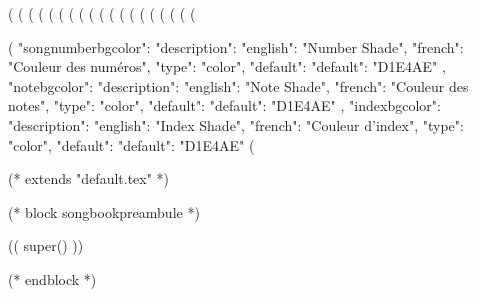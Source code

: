 (%
(%
(%
(%
(%
(%
(%
(%
(%
(%
(%
(%
(%
(%
(%
(%
(%
(%
(%


(%
{
"songnumberbgcolor": {"description": {"english": "Number Shade", "french": "Couleur des numéros"},
                     "type": "color",
                     "default": {"default": "D1E4AE"}
                  },
"notebgcolor": {"description": {"english": "Note Shade", "french": "Couleur des notes"},
               "type": "color",
               "default": {"default": "D1E4AE"}
            },
"indexbgcolor": {"description": {"english": "Index Shade", "french": "Couleur d'index"},
               "type": "color",
               "default": {"default": "D1E4AE"}
            }
}
(%

(* extends "default.tex" *)

(* block songbookpreambule *)
   \usepackage[
     a4paper %
     ,includeheadfoot %
     ,hmarginratio=1:1 %
     ,outer=1.8cm %
     ,vmarginratio=1:1 %
     ,bmargin=1.3cm %
     ]{geometry}

  (( super() ))

   \pagestyle{empty}


   \renewcommand{\snumbgcolor}{SongNumberBgColor}
   \renewcommand{\notebgcolor}{NoteBgColor}
   \renewcommand{\idxbgcolor}{IndexBgColor}
(* endblock *)

